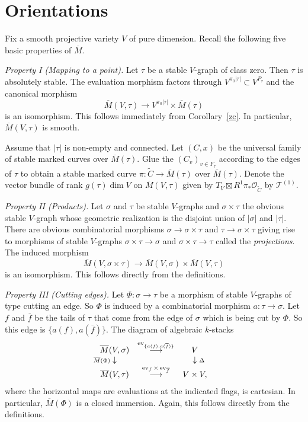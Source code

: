 \documentclass[11pt]{amsart}
\theoremstyle{definition}
\theoremstyle{remark}
\renewcommand{\tilde}{\widetilde}
\newcommand{\lst}{_{\ast}}
\newcommand{\tT}{{\mathcal{T}}}
\renewcommand{\O}{{\mathcal{O}}}
\newcommand{\ev}{\operatorname{\rm ev}}
\newcommand{\ol}{\overline}
\newcommand{\ldiag}[1]
       {\makebox[0cm]{\({\scriptstyle#1}\downarrow\phantom{\scriptstyle#1}\)}}
\newcommand{\rdiag}[1]
       {\makebox[0cm]{\(\phantom{\scriptstyle#1}\downarrow{\scriptstyle#1}\)}}
\newcommand{\comdia}[9]{
\begin{array}{ccc}
#1 & \stackrel{#2}{\longrightarrow} & #3 \\
\ldiag{#4} & #5 & \rdiag{#6} \\
#7 & \stackrel{#8}{\longrightarrow} & #9
\end{array}}
\renewcommand{\t}{_{\tau}}
\theoremstyle{plain}
\theoremstyle{definition}
\theoremstyle{remark}
\begin{document}
\section{Orientations}

Fix a smooth projective variety \(V\) of pure dimension.  Recall the following
five basic properties of \(\ol{M}\).

{\em Property I (Mapping to a point). } Let \(\tau\) be a stable \(V\)-graph of
class zero. Then \(\tau\) is absolutely
stable. The evaluation morphism factors through \(V^{\pi_0|\tau|}\subset
V^{P\t}\) and the canonical morphism
\[
\ol{M}(V,\tau)\longrightarrow V^{\pi_0|\tau|}\times\ol{M}(\tau)
\]
is an isomorphism. This follows immediately from Corollary~\ref{zc}. In
particular, \(\ol{M}(V,\tau)\) is smooth.

Assume that \(|\tau|\) is non-empty and connected. Let \((C,x)\) be the universal
family of stable marked curves over
\(\ol{M}(\tau)\). Glue the \((C_v)_{v\in F\t}\) according to the edges of \(\tau\) to
obtain a stable marked curve
\(\pi:\tilde{C}\rightarrow\ol{M}(\tau)\) over \(\ol{M}(\tau)\). Denote the vector
bundle of rank \(g(\tau)\dim V\) on
\(\ol{M}(V,\tau)\) given by \(T_V\boxtimes R^1\pi\lst\O_{\tilde{C}}\) by
\(\tT^{(1)}\).

{\em Property II (Products). } Let \(\sigma\) and \(\tau\) be stable \(V\)-graphs and
\(\sigma\times\tau\) the obvious stable
\(V\)-graph whose geometric realization is the disjoint union of \(|\sigma|\) and
\(|\tau|\). There are obvious
combinatorial morphisms \(\sigma\rightarrow\sigma\times\tau\) and
\(\tau\rightarrow\sigma\times\tau\) giving rise to morphisms
of stable \(V\)-graphs \(\sigma\times\tau\rightarrow\sigma\) and
\(\sigma\times\tau\rightarrow\tau\) called the {\em
projections}. The induced morphism
\[
\ol{M}(V,\sigma\times\tau)\longrightarrow\ol{M}(V,\sigma)
\times\ol{M}(V,\tau)
\]
is an isomorphism. This follows directly from the definitions.

{\em Property III (Cutting edges). } Let \(\Phi:\sigma\rightarrow\tau\) be a
morphism of stable \(V\)-graphs of type cutting
an edge. So \(\Phi\) is induced by a combinatorial morphism
\(a:\tau\rightarrow\sigma\). Let \(f\) and \(\ol{f}\) be the tails
of \(\tau\) that come from the edge of \(\sigma\) which is being cut by \(\Phi\). So
this edge is \(\{a(f),a(\ol{f})\}\).
The diagram of algebraic \(k\)-stacks
\begin{equation} \label{ceedd}
\comdia{\ol{M}(V,\sigma)}{\ev_{\{a(f),a(\ol{f})\}}}{V}{\ol{M}(\Phi)}{
}{\Delta}{\ol{M}(V, \tau)}{\ev_f\times
\ev_{\ol{f}}}{V\times V,}
\end{equation}
where the horizontal maps are evaluations at the indicated flags, is cartesian.
In particular, \(\ol{M}(\Phi)\) is a
closed immersion. Again, this follows directly from the definitions.
\end{document}
